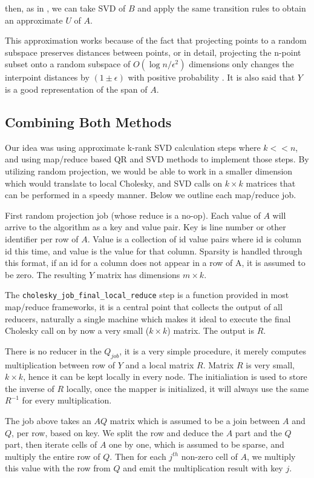 \documentclass[11pt]{article}
\begin{document}
then, as in \cite{gleich}, we can take SVD of $B$ and apply the same
transition rules to obtain an approximate $U$ of $A$.

This approximation works because of the fact that projecting points to a
random subspace preserves distances between points, or in detail,
projecting the n-point subset onto a random subspace of $O(\log
n/\epsilon^2)$ dimensions only changes the interpoint distances by $(1 \pm
\epsilon)$ with positive probability \cite{gupta}. It is also said that $Y$
is a good representation of the span of $A$.

\subsection{Combining Both Methods}

Our idea was using approximate k-rank SVD calculation steps where $k << n$,
and using map/reduce based QR and SVD methods to implement those steps. By
utilizing random projection, we would be able to work in a smaller
dimension which would translate to local Cholesky, and SVD calls on $k
\times k$ matrices that can be performed in a speedy manner. Below we
outline each map/reduce job.

First random projection job (whose reduce is a no-op). Each value of $A$
will arrive to the algorithm as a key and value pair. Key is line number or
other identifier per row of $A$. Value is a collection of id value pairs
where id is column id this time, and value is the value for that
column. Sparsity is handled through this format, if an id for a column does
not appear in a row of A, it is assumed to be zero. The resulting $Y$
matrix has dimensions $m \times k$.


The \verb!cholesky_job_final_local_reduce! step is a function provided in most
map/reduce frameworks, it is a central point that collects the output of all
reducers, naturally a single machine which makes it ideal to execute the final
Cholesky call on by now a very small ($k \times k$) matrix. The output is $R$.

There is no reducer in the $Q_{job}$, it is a very simple procedure, it merely
computes multiplication between row of $Y$ and a local matrix $R$. Matrix $R$ is
very small, $k \times k$, hence it can be kept locally in every node. The
initialiation is used to store the inverse of $R$ locally, once the mapper is
initialized, it will always use the same $R^{-1}$ for every multiplication.

The job above takes an $AQ$ matrix which is assumed to be a join between $A$ and
$Q$, per row, based on key. We split the row and deduce the $A$ part and the $Q$
part, then iterate cells of $A$ one by one, which is assumed to be sparse, and
multiply the entire row of $Q$. Then for each $j^{th}$ non-zero cell of $A$, we
multiply this value with the row from $Q$ and emit the multiplication result
with key $j$.
\end{document}
